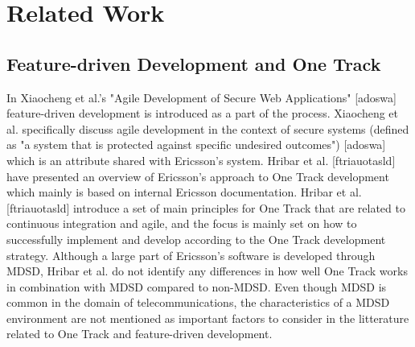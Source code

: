 \documentclass[fina_report_innit.tex]{subfiles}
\begin{document}
\section{Related Work}

\blindtext

\subsection{Feature-driven Development and One Track}
In Xiaocheng et al.'s "Agile Development of Secure Web Applications" [adoswa] feature-driven development is introduced as a part of the process. Xiaocheng et al. specifically discuss agile development in the context of secure systems (defined as "a system that is protected against specific undesired outcomes") [adoswa] which is an attribute shared with Ericsson's system. Hribar et al. [ftriauotasld] have presented an overview of Ericsson's approach to One Track development which mainly is based on internal Ericsson documentation. Hribar et al. [ftriauotasld] introduce a set of main principles for One Track that are related to continuous integration and agile, and the focus is mainly set on how to successfully implement and develop according to the One Track development strategy. Although a large part of Ericsson's software is developed through MDSD, Hribar et al. do not identify any differences in how well One Track works in combination with MDSD compared to non-MDSD. Even though MDSD is common in the domain of telecommunications, the characteristics of a MDSD environment are not mentioned as important factors to consider in the litterature related to One Track and feature-driven development. 
\end{document}
